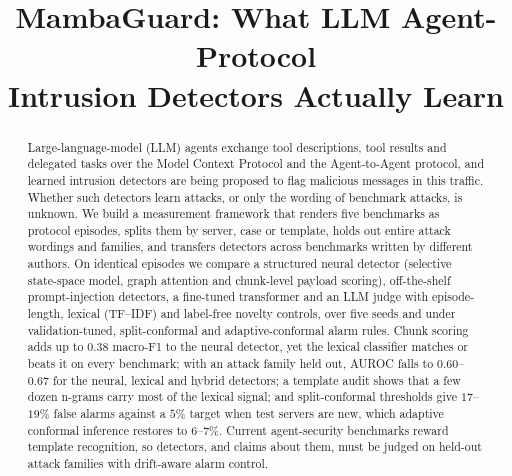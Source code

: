 \documentclass[conference,compsoc]{IEEEtran}
\begin{document}
\title{MambaGuard: What LLM Agent-Protocol\\
Intrusion Detectors Actually Learn}

\author{}

\maketitle

\begin{abstract}
Large-language-model (LLM) agents exchange tool descriptions, tool results and delegated tasks over the Model Context Protocol and the Agent-to-Agent protocol, and learned intrusion detectors are being proposed to flag malicious messages in this traffic. Whether such detectors learn attacks, or only the wording of benchmark attacks, is unknown. We build a measurement framework that renders five benchmarks as protocol episodes, splits them by server, case or template, holds out entire attack wordings and families, and transfers detectors across benchmarks written by different authors. On identical episodes we compare a structured neural detector (selective state-space model, graph attention and chunk-level payload scoring), off-the-shelf prompt-injection detectors, a fine-tuned transformer and an LLM judge with episode-length, lexical (TF--IDF) and label-free novelty controls, over five seeds and under validation-tuned, split-conformal and adaptive-conformal alarm rules. Chunk scoring adds up to $0.38$ macro-F1 to the neural detector, yet the lexical classifier matches or beats it on every benchmark; with an attack family held out, AUROC falls to $0.60$--$0.67$ for the neural, lexical and hybrid detectors; a template audit shows that a few dozen n-grams carry most of the lexical signal; and split-conformal thresholds give $17$--$19\%$ false alarms against a $5\%$ target when test servers are new, which adaptive conformal inference restores to $6$--$7\%$. Current agent-security benchmarks reward template recognition, so detectors, and claims about them, must be judged on held-out attack families with drift-aware alarm control.
\end{abstract}

\end{document}
